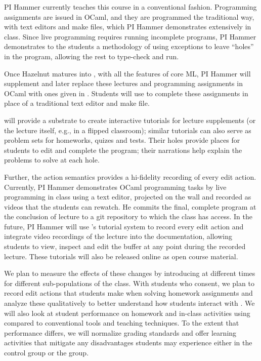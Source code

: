 PI Hammer currently teaches this course in a conventional fashion.
%
Programming assignments are issued in OCaml, and they are programmed
the traditional way, with text editors and make files, which PI Hammer
demonstrates extensively in class.
%
Since live programming requires running incomplete programs, PI Hammer
demonstrates to the students a methodology of using exceptions to
leave ``holes'' in the program, allowing the rest to type-check and
run.

Once Hazelnut matures into \Hazel, with all the features of core ML,
PI Hammer will supplement and later replace these lectures and
programming assignments in OCaml with ones given in \Hazel.
%
Students will use \Hazel to complete these assignments in place of a
traditional text editor and make file.

\Hazel will provide a
substrate to create interactive tutorials for lecture supplements (or
the lecture itself, e.g., in a flipped classroom); similar tutorials
can also serve as problem sets for homeworks, quizes and tests.
%
Their holes provide places for students to edit and complete the
program; their narrations help explain the problems to solve at each
hole.

Further, the \Hazel action semantics provides a hi-fidelity recording
of every edit action. Currently, PI Hammer demonstrates OCaml
programming tasks by live programming in class using a text editor,
projected on the wall and recorded as videos that the students can
rewatch.  He commits the final, complete program at the conclusion of
lecture to a git repository to which the class has access.
%
In the future, PI Hammer will use \Hazel's tutorial system to record every edit action
and integrate video recordings of the lecture into the documentation,
allowing students to view, inspect and edit the buffer at any point
during the recorded lecture. These tutorials will also be released online as 
open course material. 

We plan to measure the effects of these changes by introducing \Hazel at
different times for different sub-populations of the class.  With
students who consent, we plan to record edit actions that students
make when solving homework assignments and analyze these qualitatively
to better understand how students interact with \Hazel.  We will also
look at student performance on homework and in-class activities using
\Hazel compared to conventional tools and teaching techniques.  To the
extent that performance differs, we will normalize grading standards and
offer learning activities that mitigate any disadvantages students may
experience either in the control group or the \Hazel group.
%

